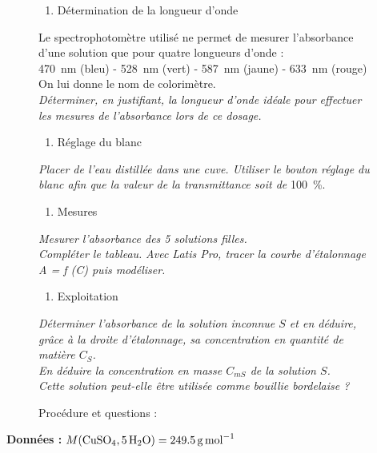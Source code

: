\documentclass[a4paper,12pt,fleqn]{article}%
\begin{document}
	\begin{figure}
		\caption*{Procédure et questions :}
		\begin{enumerate}
			\item Détermination de la longueur d'onde
		\end{enumerate}
		Le spectrophotomètre utilisé ne permet de mesurer l'absorbance d'une solution que pour quatre
		longueurs d'onde : \\
		\SI{470}{nm} (bleu) - \SI{528}{nm} (vert) - \SI{587}{nm} (jaune) - \SI{633}{nm} (rouge)\\
		On lui donne le nom de colorimètre.\\
		\textit{Déterminer, en justifiant, la longueur d'onde idéale pour effectuer les mesures de l'absorbance lors de ce dosage.}
		
		\begin{enumerate}[resume]
			\item Réglage du blanc
		\end{enumerate}
		\textit{Placer de l’eau distillée dans une cuve. Utiliser le bouton réglage du blanc afin que la valeur de la transmittance soit de} \SI{100}{\percent}.
		
		\begin{enumerate}[resume]
			\item Mesures
		\end{enumerate}
		\textit{Mesurer l'absorbance des 5 solutions filles.}\\
		\textit{Compléter le tableau.}
		\textit{Avec Latis Pro, tracer la courbe d’étalonnage A = f (C) puis modéliser.}
		
		\begin{enumerate}[resume]
			\item Exploitation
		\end{enumerate}
		\textit{Déterminer l'absorbance de la solution inconnue $S$ et en déduire, grâce à la droite
		d’étalonnage, sa concentration en quantité de matière $C_S$.}\\
		\textit{En déduire la concentration en masse $C_{mS}$ de la solution $S$.}\\
		\textit{Cette solution peut-elle être utilisée comme bouillie bordelaise ?}
	\end{figure}
	\textbf{Données :} $M (\ce{CuSO4, 5H2O}) = \SI{249,5}{\gram\per\mole}$
\end{document}
